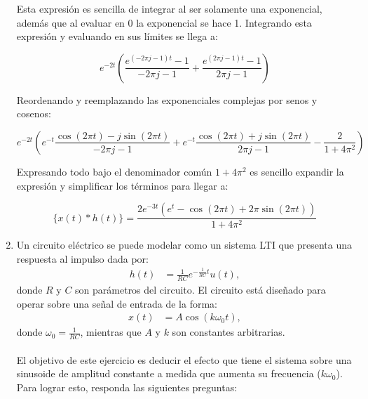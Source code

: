 \documentclass[letterpaper, 12pt]{article}
\begin{document}
\begin{enumerate}
{    Esta expresión es sencilla de integrar al ser solamente una exponencial, además que al evaluar en 0 la exponencial se hace 1. Integrando esta expresión y evaluando en sus límites se llega a:
    
    $$ e^{-2t} ( \frac{e^{(-2\pi j - 1)t} -1}{-2\pi j - 1} +  \frac{e^{(2\pi j - 1)t }-1}{2\pi j - 1}  )$$
    
    Reordenando y reemplazando las exponenciales complejas por senos y cosenos:
    
    $$ e^{-2t} ( e^{-t}\frac{\cos{(2 \pi t)} - j\sin{(2 \pi t)}}{-2\pi j - 1} + e^{-t}\frac{\cos{(2 \pi t)} + j\sin{(2 \pi t)}}{2\pi j - 1}  - \frac{2}{1+4\pi^2} )$$
    
    Expresando todo bajo el denominador común $1+4\pi^2$ es sencillo expandir la expresión y simplificar los términos para llegar a:
    
         $$\{x(t)*h(t)\} = \frac{2e^{-3t}(e^t-\cos{(2\pi t)} + 2\pi\sin{(2 \pi t)})}{1 + 4 \pi^2}$$ 

         }
    
         \fi

    \item  Un circuito eléctrico se puede modelar como un sistema LTI que presenta una respuesta al impulso dada por:
    \begin{align*}
        h(t) &= \frac{1}{RC} e^{-\frac{1}{RC}t}u(t),
    \end{align*}
    donde $R$ y $C$ son parámetros del circuito. El circuito está diseñado para operar sobre una señal de entrada de la forma:
    \begin{align*}
        x(t) &= A\cos(k\omega_0 t),
    \end{align*}
    donde $\omega_0 = \frac{1}{RC}$, mientras que $A$ y $k$ son constantes arbitrarias. 
    \\ \\
    El objetivo de este ejercicio es deducir el efecto que tiene el sistema sobre una sinusoide de amplitud constante a medida que aumenta su frecuencia ($k\omega_0$). Para lograr esto, responda las siguientes preguntas:


\end{enumerate}
\end{document}
